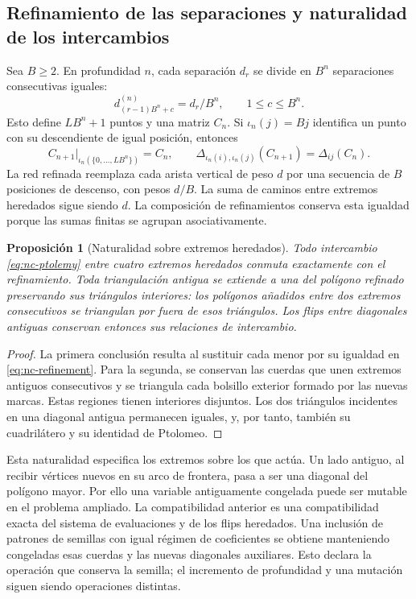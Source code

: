 \documentclass[a4paper,10pt]{article}
\newtheorem{proposition}[theorem]{Proposición}
\theoremstyle{definition}\newtheorem{definition}[theorem]{Definición}
\theoremstyle{remark}\newtheorem{remark}[theorem]{Observación}
\numberwithin{equation}{section}
\begin{document}
\subsection{Refinamiento de las separaciones y naturalidad de los intercambios}

Sea \(B\ge2\). En profundidad \(n\), cada separación \(d_r\) se divide
en \(B^n\) separaciones consecutivas iguales:
\[
 d^{(n)}_{(r-1)B^n+c}=d_r/B^n,
 \qquad 1\le c\le B^n.
\]
Esto define \(LB^n+1\) puntos y una matriz \(C_n\). Si \(\iota_n(j)=Bj\)
identifica un punto con su descendiente de igual posición, entonces
\begin{equation}
 C_{n+1}|_{\iota_n(\{0,\ldots,LB^n\})}=C_n,
 \qquad
 \Delta_{\iota_n(i),\iota_n(j)}(C_{n+1})=\Delta_{ij}(C_n).
 \label{eq:nc-refinement}
\end{equation}
La red refinada reemplaza cada arista vertical de peso \(d\) por una
secuencia de \(B\) posiciones de descenso, con pesos \(d/B\). La suma
de caminos entre extremos heredados sigue siendo \(d\). La composición de
refinamientos conserva esta igualdad porque las sumas finitas se agrupan
asociativamente.

\begin{proposition}[Naturalidad sobre extremos heredados]
\label{prop:nc-inherited}
Todo intercambio \eqref{eq:nc-ptolemy} entre cuatro extremos heredados
conmuta exactamente con el refinamiento. Toda triangulación antigua se
extiende a una del polígono refinado preservando sus triángulos interiores:
los polígonos añadidos entre dos extremos consecutivos se triangulan por
fuera de esos triángulos. Los flips entre diagonales antiguas conservan
entonces sus relaciones de intercambio.
\end{proposition}
\begin{proof}
La primera conclusión resulta al sustituir cada menor por su igualdad en
\eqref{eq:nc-refinement}. Para la segunda, se conservan las cuerdas que
unen extremos antiguos consecutivos y se triangula cada bolsillo exterior
formado por las nuevas marcas. Estas regiones tienen interiores disjuntos.
Los dos triángulos incidentes en una diagonal antigua permanecen iguales,
y, por tanto, también su cuadrilátero y su identidad de Ptolomeo.
\end{proof}

Esta naturalidad especifica los extremos sobre los que actúa. Un lado
antiguo, al recibir vértices nuevos en su arco de frontera, pasa a ser una
diagonal del polígono mayor. Por ello una variable antiguamente congelada
puede ser mutable en el problema ampliado. La compatibilidad anterior es
una compatibilidad exacta del sistema de evaluaciones y de los flips
heredados. Una inclusión de patrones de semillas con igual régimen de
coeficientes se obtiene manteniendo congeladas esas cuerdas y las nuevas
diagonales auxiliares. Esto declara la operación que conserva la semilla;
el incremento de profundidad y una mutación siguen siendo operaciones
distintas.
\end{document}
